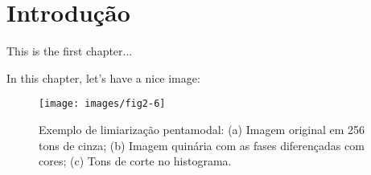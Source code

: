 
\chapter{Introdução}

This is the first chapter...

In this chapter, let's have a nice image:

\begin{figure} [h]
  \begin{center}
    \texttt{[image: images/fig2-6]}
    \caption{Exemplo de limiarização pentamodal: (a) Imagem original
      em 256 tons de cinza; (b) Imagem quinária com as fases
      diferençadas com cores; (c) Tons de corte no
      histograma.\cite{74}}\label{fig:2-6}
  \end{center}
\end{figure}
